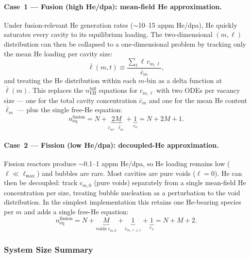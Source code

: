 \paragraph{Case~1 --- Fusion (high He/dpa): mean-field He approximation.}
Under fusion-relevant He generation rates ($\sim$10--15 appm He/dpa), He
quickly saturates every cavity to its equilibrium loading. The two-dimensional
$(m,\ell)$ distribution can then be collapsed to a one-dimensional problem
by tracking only the mean He loading per cavity size:
\begin{equation}\label{eq:mean_He}
    \bar{\ell}(m,t) \equiv \frac{\sum_\ell \ell\,c_{m,\ell}}{\bar{c}_m},
\end{equation}
and treating the He distribution within each $m$-bin as a delta function
at $\bar{\ell}(m)$. This replaces the $n_{VH}^{\mathrm{full}}$ equations
for $c_{m,\ell}$ with two ODEs per vacancy size --- one for the total
cavity concentration $\bar{c}_m$ and one for the mean He content
$\bar{\ell}_m$ --- plus the single free-He equation:
\begin{equation}\label{eq:nVH_fusion}
    n_{\mathrm{eq}}^{\mathrm{fusion}}
    = N + \underbrace{2M}_{\bar{c}_m,\;\bar{\ell}_m} + \underbrace{1}_{c_h}
    = N + 2M + 1.
\end{equation}

\paragraph{Case~2 --- Fission (low He/dpa): decoupled-He approximation.}
Fission reactors produce $\sim$0.1--1 appm He/dpa, so He loading remains
low ($\ell \ll \ell_{\max}$) and bubbles are rare. Most cavities are pure
voids ($\ell = 0$). He can then be decoupled: track $c_{m,0}$ (pure voids)
separately from a single mean-field He concentration per size, treating
bubble nucleation as a perturbation to the void distribution. In the
simplest implementation this retains one He-bearing species per $m$ and
adds a single free-He equation:
\begin{equation}\label{eq:nVH_fission}
    n_{\mathrm{eq}}^{\mathrm{fission}}
    = N + \underbrace{M}_{\text{voids }c_{m,0}} + \underbrace{1}_{\bar{c}_{m,\ell\geq 1}}
      + \underbrace{1}_{c_h}
    = N + M + 2.
\end{equation}

\subsubsection{System Size Summary}
\label{sec:system_size_table}

